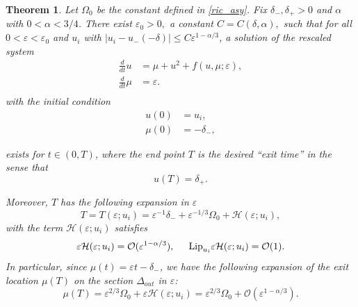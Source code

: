 \documentclass[letterpaper,11pt]{article}
\newcommand{\rmO}{\mathcal{O}}
\newcommand{\eps}{\varepsilon}
\numberwithin{equation}{section}
\theoremstyle{plain}
\newtheorem{Theorem}{Theorem}
\begin{document}
\begin{Theorem}\label{thm:main}Let $\Omega_0$ be the constant defined in \eqref{ric_asy}.
Fix $\delta_-, \delta_+>0$ and $\alpha$ with $0<\alpha <3/4$. There exist $\eps_0>0,$ a constant $C=C(\delta,\alpha),$ such that for all $0<\eps<\eps_0$ and $u_i$ with $|u_i -u_-(-\delta) | \le C\eps^{1-\alpha/3}$, a solution of the rescaled system 
\begin{equation}\label{main_eqn}
\begin{split}
\frac{d}{dt}u &= \mu+u^2+ f(u,\mu;\eps), \\
\frac{d}{dt} \mu &= \eps.  \\
\end{split}
\end{equation}
with the initial condition
\begin{equation}\label{main_ic}
\begin{split}
u(0) &= u_i, \\
\mu(0) &= -\delta_-,
\end{split}
\end{equation}

exists for $t \in (0,T)$, where the end point $T$ is the desired ``exit time'' in the sense that 
\begin{equation}\label{exit_time_cond}
 u(T) = \delta_+.
\end{equation}

Moreover, $T$ has the following expansion in $\eps$
\begin{equation}\label{T_exp_+}
T = T(\eps ; u_i) = \eps^{-1}\delta_- + \eps^{-1/3}\Omega_0 +  \mathcal{H}(\eps; u_i),
\end{equation}
with the term $\mathcal{H}(\eps;u_i)$ satisfies 
\begin{equation}\label{T_remainder_exp}
\eps\mathcal{H}(\eps;u_i) = \rmO(\eps^{1-\alpha/3}), \hspace{0.2in} \text{Lip}_{u_i}\eps\mathcal{H}(\eps;u_i) = \rmO(1).
\end{equation}
In particular, since $\mu(t) = \eps t -\delta_-$, we have the following expansion of the exit location $\mu(T)$ on the section $\Delta_{out}$ in $\eps$:
\begin{equation}\label{exit_loc_exp}
\mu(T) = \eps^{2/3}\Omega_0  + \eps\mathcal{H}(\eps; u_i) = \eps^{2/3}\Omega_0 + \rmO(\eps^{1-\alpha/3}).
\end{equation}

\end{Theorem}
\end{document}
